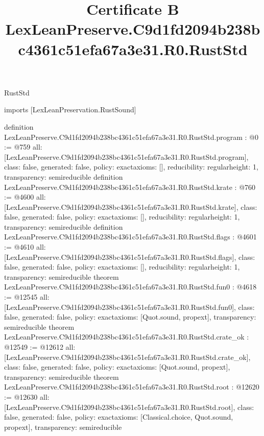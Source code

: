 \begin{lexlean}{RustStd}
\title{Certificate B LexLeanPreserve.C9d1fd2094b238bc4361c51efa67a3e31.R0.RustStd}
\begin{coremodule}
imports [LexLeanPreservation.RustSound]

definition LexLeanPreserve.C9d1fd2094b238bc4361c51efa67a3e31.R0.RustStd.program : @0 := @759 {
  all: [LexLeanPreserve.C9d1fd2094b238bc4361c51efa67a3e31.R0.RustStd.program],
  class: false,
  generated: false,
  policy: exact{axioms: []},
  reducibility: regular{height: 1},
  transparency: semireducible
}
definition LexLeanPreserve.C9d1fd2094b238bc4361c51efa67a3e31.R0.RustStd.krate : @760 := @4600 {
  all: [LexLeanPreserve.C9d1fd2094b238bc4361c51efa67a3e31.R0.RustStd.krate],
  class: false,
  generated: false,
  policy: exact{axioms: []},
  reducibility: regular{height: 1},
  transparency: semireducible
}
definition LexLeanPreserve.C9d1fd2094b238bc4361c51efa67a3e31.R0.RustStd.flags : @4601 := @4610 {
  all: [LexLeanPreserve.C9d1fd2094b238bc4361c51efa67a3e31.R0.RustStd.flags],
  class: false,
  generated: false,
  policy: exact{axioms: []},
  reducibility: regular{height: 1},
  transparency: semireducible
}
theorem LexLeanPreserve.C9d1fd2094b238bc4361c51efa67a3e31.R0.RustStd.fun0 : @4618 := @12545 {
  all: [LexLeanPreserve.C9d1fd2094b238bc4361c51efa67a3e31.R0.RustStd.fun0],
  class: false,
  generated: false,
  policy: exact{axioms: [Quot.sound, propext]},
  transparency: semireducible
}
theorem LexLeanPreserve.C9d1fd2094b238bc4361c51efa67a3e31.R0.RustStd.crate_ok : @12549 := @12612 {
  all: [LexLeanPreserve.C9d1fd2094b238bc4361c51efa67a3e31.R0.RustStd.crate_ok],
  class: false,
  generated: false,
  policy: exact{axioms: [Quot.sound, propext]},
  transparency: semireducible
}
theorem LexLeanPreserve.C9d1fd2094b238bc4361c51efa67a3e31.R0.RustStd.root : @12620 := @12630 {
  all: [LexLeanPreserve.C9d1fd2094b238bc4361c51efa67a3e31.R0.RustStd.root],
  class: false,
  generated: false,
  policy: exact{axioms: [Classical.choice, Quot.sound, propext]},
  transparency: semireducible
}


\end{coremodule}
\end{lexlean}
